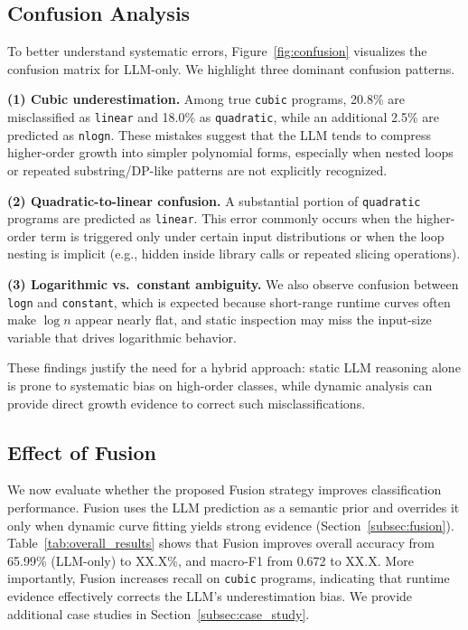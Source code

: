 \documentclass[conference]{IEEEtran}
\begin{document}
 \subsection{Confusion Analysis} 
 \label{subsec:confusion_analysis} 
 
 To better understand systematic errors, Figure~\ref{fig:confusion} visualizes the confusion matrix for 
 LLM-only. We highlight three dominant confusion patterns. 
 
 \textbf{(1) Cubic underestimation.} 
 Among true \texttt{cubic} programs, 20.8\% are misclassified as \texttt{linear} and 18.0\% as 
 \texttt{quadratic}, while an additional 2.5\% are predicted as \texttt{nlogn}. These mistakes suggest that 
 the LLM tends to compress higher-order growth into simpler polynomial forms, especially when nested loops 
 or repeated substring/DP-like patterns are not explicitly recognized. 
 
 \textbf{(2) Quadratic-to-linear confusion.} 
 A substantial portion of \texttt{quadratic} programs are predicted as \texttt{linear}. This error commonly 
 occurs when the higher-order term is triggered only under certain input distributions or when the loop 
 nesting is implicit (e.g., hidden inside library calls or repeated slicing operations). 
 
 \textbf{(3) Logarithmic vs.\ constant ambiguity.} 
 We also observe confusion between \texttt{logn} and \texttt{constant}, which is expected because short-range 
 runtime curves often make $\log n$ appear nearly flat, and static inspection may miss the input-size 
 variable that drives logarithmic behavior. 
 
 These findings justify the need for a hybrid approach: static LLM reasoning alone is prone to systematic 
 bias on high-order classes, while dynamic analysis can provide direct growth evidence to correct such 
 misclassifications. 
 
 \subsection{Effect of Fusion} 
 \label{subsec:fusion_effect} 
 
 We now evaluate whether the proposed Fusion strategy improves classification performance. 
 Fusion uses the LLM prediction as a semantic prior and overrides it only when dynamic curve fitting yields 
 strong evidence (Section~\ref{subsec:fusion}). 
 Table~\ref{tab:overall_results} shows that Fusion improves overall accuracy from 65.99\% (LLM-only) to 
 XX.X\%, and macro-F1 from 0.672 to XX.X. 
 More importantly, Fusion increases recall on \texttt{cubic} programs, indicating that runtime evidence 
 effectively corrects the LLM's underestimation bias. 
 We provide additional case studies in Section~\ref{subsec:case_study}. 
 
\end{document}

